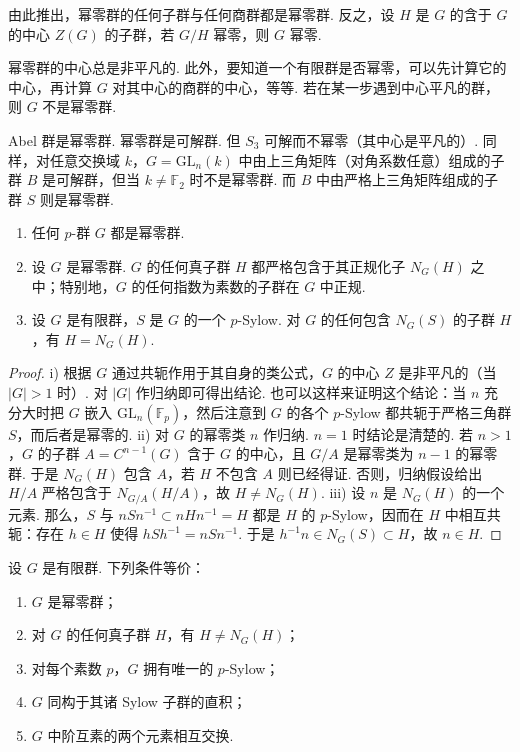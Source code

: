 由此推出，幂零群的任何子群与任何商群都是幂零群. 反之，设 $H$ 是 $G$ 的含于 $G$ 的中心 $Z(G)$ 的子群，若 $G/H$ 幂零，则 $G$ 幂零.

幂零群的中心总是非平凡的. 此外，要知道一个有限群是否幂零，可以先计算它的中心，再计算 $G$ 对其中心的商群的中心，等等. 若在某一步遇到中心平凡的群，则 $G$ 不是幂零群.

\begin{example}\label{ex:fg-3-2-9}
Abel 群是幂零群. 幂零群是可解群. 但 $S_3$ 可解而不幂零（其中心是平凡的）. 同样，对任意交换域 $k$，$G=\mathrm{GL}_n(k)$ 中由上三角矩阵（对角系数任意）组成的子群 $B$ 是可解群，但当 $k\neq\mathbb{F}_2$ 时不是幂零群. 而 $B$ 中由严格上三角矩阵组成的子群 $S$ 则是幂零群.
\end{example}

\begin{proposition}\label{prop:fg-3-2-10}
\begin{enumerate}[label=\roman*)]
\item 任何 $p$-群 $G$ 都是幂零群.
\item 设 $G$ 是幂零群. $G$ 的任何真子群 $H$ 都严格包含于其正规化子 $N_G(H)$ 之中；特别地，$G$ 的任何指数为素数的子群在 $G$ 中正规.
\item 设 $G$ 是有限群，$S$ 是 $G$ 的一个 $p$-Sylow. 对 $G$ 的任何包含 $N_G(S)$ 的子群 $H$，有 $H=N_G(H)$.
\end{enumerate}
\end{proposition}

\begin{proof}
i) 根据 $G$ 通过共轭作用于其自身的类公式，$G$ 的中心 $Z$ 是非平凡的（当 $|G|>1$ 时）. 对 $|G|$ 作归纳即可得出结论. 也可以这样来证明这个结论：当 $n$ 充分大时把 $G$ 嵌入 $\mathrm{GL}_n(\mathbb{F}_p)$，然后注意到 $G$ 的各个 $p$-Sylow 都共轭于严格三角群 $S$，而后者是幂零的.
ii) 对 $G$ 的幂零类 $n$ 作归纳. $n=1$ 时结论是清楚的. 若 $n>1$，$G$ 的子群 $A=C^{n-1}(G)$ 含于 $G$ 的中心，且 $G/A$ 是幂零类为 $n-1$ 的幂零群. 于是 $N_G(H)$ 包含 $A$，若 $H$ 不包含 $A$ 则已经得证. 否则，归纳假设给出 $H/A$ 严格包含于 $N_{G/A}(H/A)$，故 $H\neq N_G(H)$.
iii) 设 $n$ 是 $N_G(H)$ 的一个元素. 那么，$S$ 与 $nSn^{-1}\subset nHn^{-1}=H$ 都是 $H$ 的 $p$-Sylow，因而在 $H$ 中相互共轭：存在 $h\in H$ 使得 $hSh^{-1}=nSn^{-1}$. 于是 $h^{-1}n\in N_G(S)\subset H$，故 $n\in H$.
\end{proof}

\begin{theorem}\label{thm:fg-3-2-11}
设 $G$ 是有限群. 下列条件等价：
\begin{enumerate}[label=\roman*)]
\item $G$ 是幂零群；
\item 对 $G$ 的任何真子群 $H$，有 $H\neq N_G(H)$；
\item 对每个素数 $p$，$G$ 拥有唯一的 $p$-Sylow；
\item $G$ 同构于其诸 Sylow 子群的直积；
\item $G$ 中阶互素的两个元素相互交换.
\end{enumerate}
\end{theorem}

